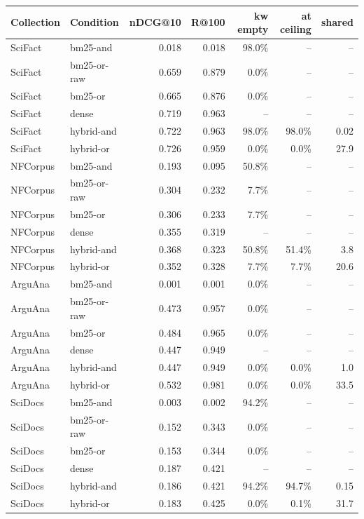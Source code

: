 \documentclass[11pt]{article}
\begin{document}
\begin{table}[p]
\centering
\small
\begin{tabular}{llrrrrr}
\toprule
Collection & Condition & nDCG@10 & R@100 & kw empty & at ceiling & shared \\
\midrule
SciFact & bm25-and & 0.018 & 0.018 & 98.0\% & -- & -- \\
SciFact & bm25-or-raw & 0.659 & 0.879 & 0.0\% & -- & -- \\
SciFact & bm25-or & 0.665 & 0.876 & 0.0\% & -- & -- \\
SciFact & dense & 0.719 & 0.963 & -- & -- & -- \\
SciFact & hybrid-and & 0.722 & 0.963 & 98.0\% & 98.0\% & 0.02 \\
SciFact & hybrid-or & 0.726 & 0.959 & 0.0\% & 0.0\% & 27.9 \\
\midrule
NFCorpus & bm25-and & 0.193 & 0.095 & 50.8\% & -- & -- \\
NFCorpus & bm25-or-raw & 0.304 & 0.232 & 7.7\% & -- & -- \\
NFCorpus & bm25-or & 0.306 & 0.233 & 7.7\% & -- & -- \\
NFCorpus & dense & 0.355 & 0.319 & -- & -- & -- \\
NFCorpus & hybrid-and & 0.368 & 0.323 & 50.8\% & 51.4\% & 3.8 \\
NFCorpus & hybrid-or & 0.352 & 0.328 & 7.7\% & 7.7\% & 20.6 \\
\midrule
ArguAna & bm25-and & 0.001 & 0.001 & 0.0\% & -- & -- \\
ArguAna & bm25-or-raw & 0.473 & 0.957 & 0.0\% & -- & -- \\
ArguAna & bm25-or & 0.484 & 0.965 & 0.0\% & -- & -- \\
ArguAna & dense & 0.447 & 0.949 & -- & -- & -- \\
ArguAna & hybrid-and & 0.447 & 0.949 & 0.0\% & 0.0\% & 1.0 \\
ArguAna & hybrid-or & 0.532 & 0.981 & 0.0\% & 0.0\% & 33.5 \\
\midrule
SciDocs & bm25-and & 0.003 & 0.002 & 94.2\% & -- & -- \\
SciDocs & bm25-or-raw & 0.152 & 0.343 & 0.0\% & -- & -- \\
SciDocs & bm25-or & 0.153 & 0.344 & 0.0\% & -- & -- \\
SciDocs & dense & 0.187 & 0.421 & -- & -- & -- \\
SciDocs & hybrid-and & 0.186 & 0.421 & 94.2\% & 94.7\% & 0.15 \\
SciDocs & hybrid-or & 0.183 & 0.425 & 0.0\% & 0.1\% & 31.7 \\

\end{tabular}
\end{table}
\end{document}
